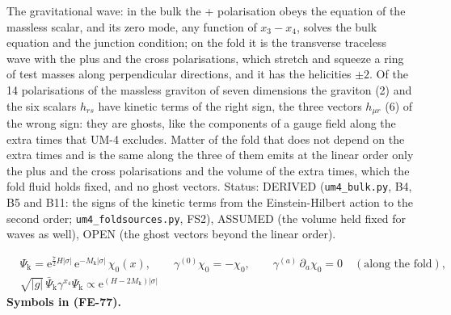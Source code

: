 \documentclass[
  10pt,
]{article}
\begin{document}
The gravitational wave: in the bulk the + polarisation obeys the
equation of the massless scalar, and its zero mode, any function of
\(x_3 - x_4\), solves the bulk equation and the junction condition; on
the fold it is the transverse traceless wave with the plus and the cross
polarisations, which stretch and squeeze a ring of test masses along
perpendicular directions, and it has the helicities \(\pm2\). Of the 14
polarisations of the massless graviton of seven dimensions the graviton
(2) and the six scalars \(h_{rs}\) have kinetic terms of the right sign,
the three vectors \(h_{\mu r}\) (6) of the wrong sign: they are ghosts,
like the components of a gauge field along the extra times that UM-4
excludes. Matter of the fold that does not depend on the extra times and
is the same along the three of them emits at the linear order only the
plus and the cross polarisations and the volume of the extra times,
which the fold fluid holds fixed, and no ghost vectors. Status: DERIVED
(\texttt{um4\_bulk.py}, B4, B5 and B11: the signs of the kinetic terms
from the Einstein-Hilbert action to the second order;
\texttt{um4\_foldsources.py}, FS2), ASSUMED (the volume held fixed for
waves as well), OPEN (the ghost vectors beyond the linear order).

\[
\begin{aligned}
&\Psi_{\mathrm{k}} = \mathrm{e}^{\frac72H\lvert\sigma\rvert}\,\mathrm{e}^{-M_{\mathrm{k}}\lvert\sigma\rvert}\,\chi_0(x),\qquad
\gamma^{(0)}\chi_0 = -\chi_0,\qquad \gamma^{(a)}\,\partial_a\chi_0 = 0\quad(\text{along the fold}),\\
&\sqrt{\lvert g\rvert}\,\bar\Psi_{\mathrm{k}}\gamma^{x_4}\Psi_{\mathrm{k}} \propto \mathrm{e}^{(H - 2M_{\mathrm{k}})\lvert\sigma\rvert}
\end{aligned} \tag{FE-77}
\] \textbf{Symbols in (FE-77).}
\end{document}
